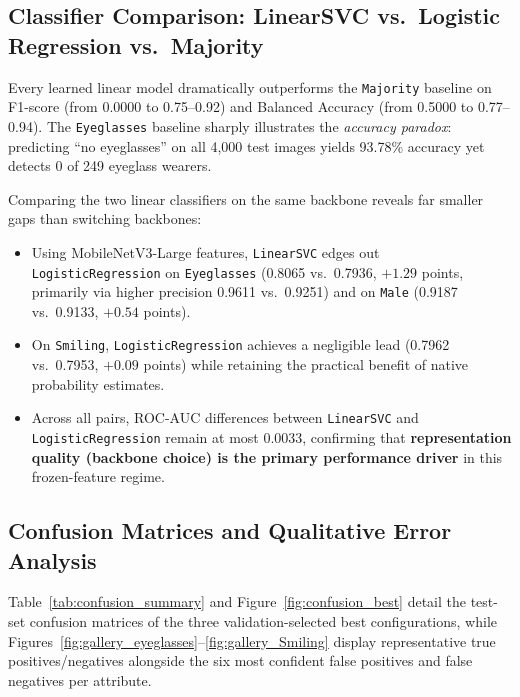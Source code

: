 \documentclass[12pt,a4paper]{article}
\newcommand{\code}[1]{\texttt{#1}}
\begin{document}
\subsection{Classifier Comparison: LinearSVC vs.\ Logistic Regression vs.\ Majority}
\label{subsec:classifier_comp}

Every learned linear model dramatically outperforms the \code{Majority} baseline on F1-score (from 0.0000 to 0.75--0.92) and Balanced Accuracy (from 0.5000 to 0.77--0.94). The \code{Eyeglasses} baseline sharply illustrates the \emph{accuracy paradox}: predicting ``no eyeglasses'' on all 4,000 test images yields 93.78\% accuracy yet detects 0 of 249 eyeglass wearers.

Comparing the two linear classifiers on the same backbone reveals far smaller gaps than switching backbones:
\begin{itemize}[leftmargin=18pt, itemsep=2pt]
  \item Using MobileNetV3-Large features, \code{LinearSVC} edges out \code{LogisticRegression} on \code{Eyeglasses} (0.8065 vs.\ 0.7936, $+1.29$ points, primarily via higher precision 0.9611 vs.\ 0.9251) and on \code{Male} (0.9187 vs.\ 0.9133, $+0.54$ points).
  \item On \code{Smiling}, \code{LogisticRegression} achieves a negligible lead (0.7962 vs.\ 0.7953, $+0.09$ points) while retaining the practical benefit of native probability estimates.
  \item Across all pairs, ROC-AUC differences between \code{LinearSVC} and \code{LogisticRegression} remain at most 0.0033, confirming that \textbf{representation quality (backbone choice) is the primary performance driver} in this frozen-feature regime.
\end{itemize}

\subsection{Confusion Matrices and Qualitative Error Analysis}
\label{subsec:error_analysis}

Table~\ref{tab:confusion_summary} and Figure~\ref{fig:confusion_best} detail the test-set confusion matrices of the three validation-selected best configurations, while Figures~\ref{fig:gallery_eyeglasses}--\ref{fig:gallery_Smiling} display representative true positives/negatives alongside the six most confident false positives and false negatives per attribute.
\end{document}
